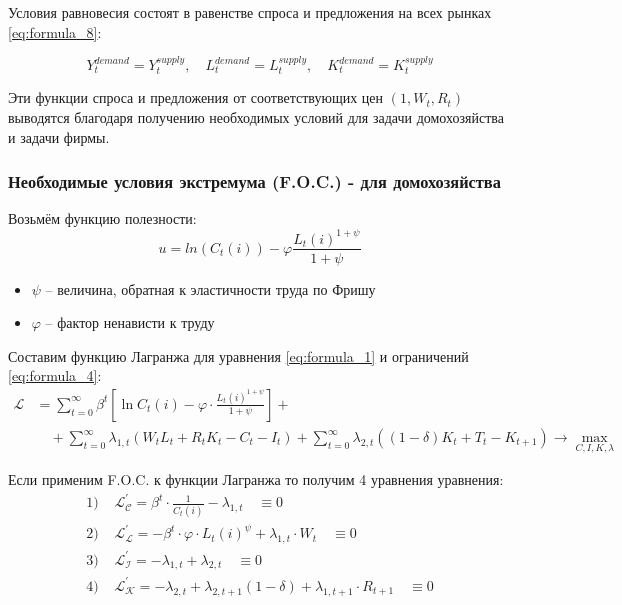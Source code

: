 \documentclass[a4paper,12pt]{article}
\begin{document}
{Условия равновесия состоят в равенстве спроса и предложения на всех рынках \eqref{eq:formula_8}:

\begin{equation}
Y_t^{demand} = Y_t^{supply}, \quad L_t^{demand} = L_t^{supply}, \quad K_t^{demand} = K_t^{supply}
\label{eq:formula_8}
\end{equation}

Эти функции спроса и предложения от соответствующих цен $(1, W_t, R_t)$ выводятся благодаря получению необходимых условий для задачи домохозяйства и задачи фирмы.


\subsubsection{Необходимые условия экстремума (F.O.C.) - для домохозяйства}
Возьмём функцию полезности:
\[
    u = ln(C_t(i)) - \varphi \frac{L_t(i)^{1+\psi}}{1 + \psi}
\]

\smallskip
{}
\begin{itemize}
    \item $\psi$ -- величина, обратная к эластичности труда по Фришу
    \item $\varphi$ -- фактор ненависти к труду
\end{itemize}

Составим функцию Лагранжа для уравнения \eqref{eq:formula_1} и ограничений \eqref{eq:formula_4}:
\begin{align*}
\mathcal{L} &= \sum_{t=0}^{\infty} \beta^t \left[ \ln C_t(i)  - \varphi \cdot \frac{L_t(i)^{1+\psi}}{1 + \psi} \right] + \\ 
    &\quad + \sum_{t=0}^{\infty} \lambda_{1,t} \left( W_t L_t + R_t K_t - C_t - I_t \right) 
    + \sum_{t=0}^{\infty} \lambda_{2,t} \left( (1-\delta) K_t + T_t - K_{t+1} \right) \rightarrow \max_{C, I, K, \lambda} 
\end{align*}

Если применим F.O.C. к функции Лагранжа то получим 4 уравнения уравнения:
\begin{align*}
    \text{1) } & \mathcal{L^{'}_{C}} = \beta^{t} \cdot \frac{1}{C_t(i)} - \lambda_{1,t} \quad  \equiv 0  \\
    \text{2) } & \mathcal{L^{'}_{L}}= -\beta^{t} \cdot \varphi \cdot L_t(i)^{\psi} + \lambda_{1,t} \cdot W_t \quad  \equiv 0  \\
    \text{3) } & \mathcal{L^{'}_{I}}= -\lambda_{1,t} + \lambda_{2,t} \quad   \equiv 0\\
    \text{4) } & \mathcal{L^{'}_{K}}= -\lambda_{2,t} + \lambda_{2,t+1} (1-\delta) + \lambda_{1,t+1} \cdot R_{t+1} \quad  \equiv 0  
\end{align*}

}
\end{document}
